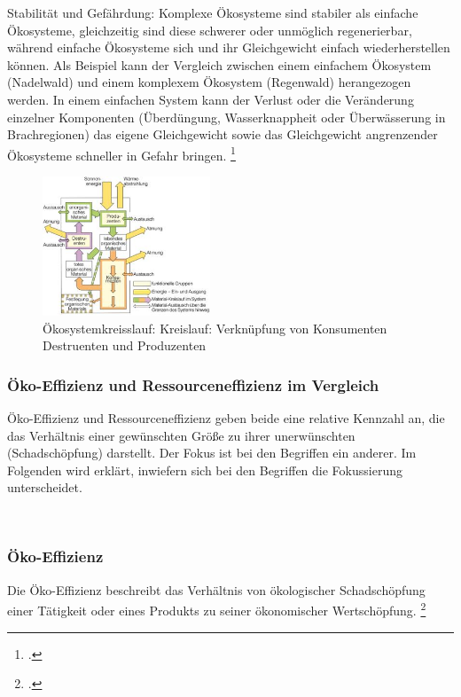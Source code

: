 \documentclass{scrartcl}
\begin{document}
\hfill \break
Stabilität und Gefährdung: Komplexe Ökosysteme sind stabiler als einfache Ökosysteme, gleichzeitig sind diese schwerer oder unmöglich regenerierbar, während einfache Ökosysteme sich und ihr Gleichgewicht einfach wiederherstellen können. Als Beispiel kann der Vergleich zwischen einem einfachem Ökosystem (Nadelwald) und einem komplexem Ökosystem (Regenwald) herangezogen werden.
In einem einfachen System kann der Verlust oder die Veränderung einzelner Komponenten (Überdüngung, Wasserknappheit oder Überwässerung in Brachregionen) das eigene Gleichgewicht sowie das Gleichgewicht angrenzender Ökosysteme schneller in Gefahr bringen. \footcite{DefinitionWirtschaftslexikone}

\begin{figure}[htbp]
\centering
\includegraphics[width=5cm]{image_folder/oekosystemkreisslauf.png}
\caption{Ökosystemkreisslauf: Kreislauf: Verknüpfung von Konsumenten Destruenten und Produzenten}
\label{fig:Ökosystemkreisslauf}
\end{figure}



        
\subsubsection{Öko-Effizienz und Ressourceneffizienz im Vergleich}

Öko-Effizienz und Ressourceneffizienz geben beide eine relative Kennzahl an, die das Verhältnis einer gewünschten Größe zu ihrer unerwünschten (Schadschöpfung) darstellt. Der Fokus ist bei den Begriffen ein anderer. Im Folgenden wird erklärt, inwiefern sich bei den Begriffen die Fokussierung unterscheidet.

\\
\subsubsection{Öko-Effizienz}
Die Öko-Effizienz beschreibt das Verhältnis von ökologischer Schadschöpfung einer Tätigkeit oder eines Produkts zu seiner ökonomischer Wertschöpfung. \footcite[Vgl.][S.]{Schaltegger1990OkologischeUnternehmung} 
\end{document}
